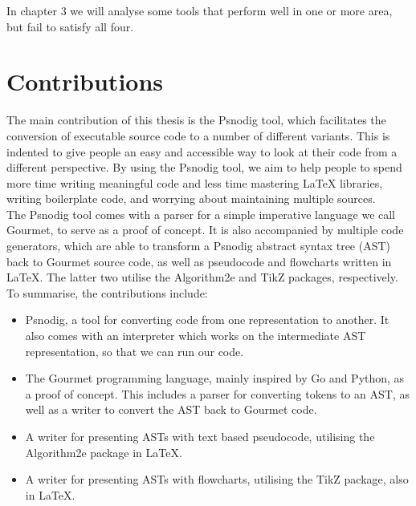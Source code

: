 

In chapter 3 we will analyse some tools that perform well in one or more area, but fail to satisfy all four.

\section{Contributions}

The main contribution of this thesis is the Psnodig tool, which facilitates the conversion of executable source code to a number of different variants. This is indented to give people an easy and accessible way to look at their code from a different perspective. By using the Psnodig tool, we aim to help people to spend more time writing meaningful code and less time mastering LaTeX libraries, writing boilerplate code, and worrying about maintaining multiple sources. \\

The Psnodig tool comes with a parser for a simple imperative language we call Gourmet, to serve as a proof of concept. It is also accompanied by multiple code generators, which are able to transform a Psnodig abstract syntax tree (AST) back to Gourmet source code, as well as pseudocode and flowcharts written in LaTeX. The latter two utilise the Algorithm2e and TikZ packages, respectively. \\

To summarise, the contributions include:
\begin{itemize}
    \item Psnodig, a tool for converting code from one representation to another. It also comes with an interpreter which works on the intermediate AST representation, so that we can run our code.
    \item The Gourmet programming language, mainly inspired by Go and Python, as a proof of concept. This includes a parser for converting tokens to an AST, as well as a writer to convert the AST back to Gourmet code.
    \item A writer for presenting ASTs with text based pseudocode, utilising the Algorithm2e package in LaTeX.
    \item A writer for presenting ASTs with flowcharts, utilising the TikZ package, also in LaTeX.
\end{itemize}

